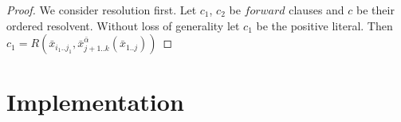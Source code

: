 \documentclass[english, shortabstract]{iithesis}
\theoremstyle{definition} \newtheorem{definition}{Definition}[chapter]
\theoremstyle{remark} \newtheorem{remark}[definition]{Observation}
\theoremstyle{plain} \newtheorem{theorem}[definition]{Theorem}
\theoremstyle{plain} \newtheorem{lemma}[definition]{Lemma}
\begin{document}
\begin{proof}
\par We consider resolution first. Let $c_1$, $c_2$ be $forward$ clauses and $c$ be their ordered resolvent.
Without loss of generality let $c_1$ be the positive literal. 
Then $c_1=R(\bar{x}_{i_1..j_1}, \bar{x}^{\bar{\alpha}}_{{j+1..k}}(\bar{x}_{1..j}))$
\end{proof}

\chapter{Implementation}




\end{document}
